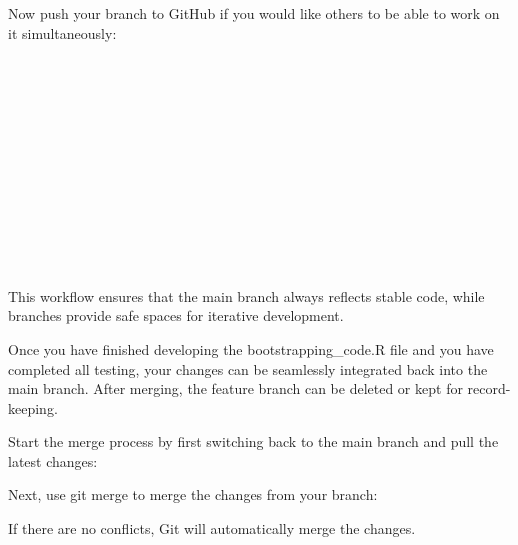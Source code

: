 \newpage
\noindent Now push your branch to GitHub if you would like others to be able to work on it simultaneously:
\begin{terminal}
\\
\\
\\
\\
\\
\\
\\
\\
\\
\\
\\
\end{terminal}
This workflow ensures that the main branch always reflects stable code, while branches provide safe spaces for iterative development. 

Once you have finished developing the bootstrapping\_code.R file and you have completed all testing, your changes can be seamlessly integrated back into the main branch. After merging, the feature branch can be deleted or kept for record-keeping.

Start the merge process by first switching back to the main branch and pull the latest changes:
\begin{terminal}
\end{terminal}

Next, use git merge to merge the changes from your branch:
\begin{terminal}
\end{terminal}
If there are no conflicts, Git will automatically merge the changes.

